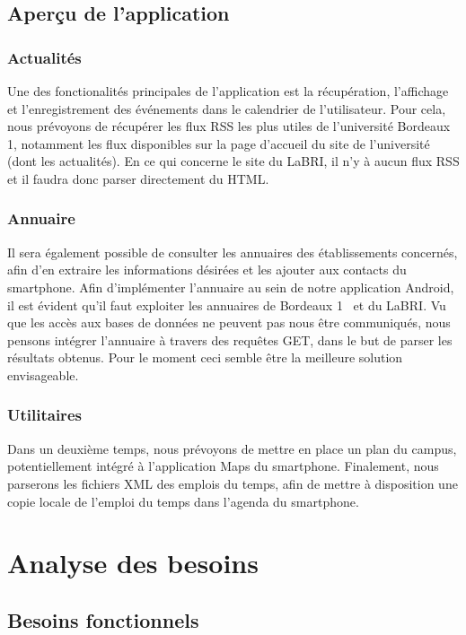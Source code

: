 \documentclass [pdftex,12pt] {report}
\begin{document}
\section{Aperçu de l'application}

\subsection{Actualités}
Une des fonctionalités principales de l'application est la récupération, l'affichage et l'enregistrement des événements dans le calendrier de l'utilisateur. 
Pour cela, nous prévoyons de récupérer les flux RSS les plus utiles de l'université Bordeaux 1\cite{fluxBDX1}, notamment les flux disponibles sur la page d'accueil du site de l'université (dont les actualités).
En ce qui concerne le site du LaBRI, il n'y à aucun flux RSS et il faudra donc parser directement du HTML.

\subsection{Annuaire}
Il sera également possible de consulter les annuaires des établissements concernés, afin d'en extraire les informations désirées et les ajouter aux contacts du smartphone.
Afin d'implémenter l'annuaire au sein de notre application Android, il est évident qu'il faut exploiter les annuaires de Bordeaux 1~\cite{AnnuaireBdx1} et du LaBRI. Vu que les accès aux bases de données ne peuvent pas nous être communiqués, nous pensons intégrer l'annuaire à travers des requêtes GET, dans le but de parser les résultats obtenus. Pour le moment ceci semble être la meilleure solution envisageable.

\subsection{Utilitaires}
Dans un deuxième temps, nous prévoyons de mettre en place un plan du campus, potentiellement intégré à l'application Maps du smartphone.
Finalement, nous parserons les fichiers XML des emplois du temps\cite{EdTxml}, afin de mettre à disposition une copie locale de l'emploi du temps dans l'agenda du smartphone.


\chapter{Analyse des besoins}

\section{Besoins fonctionnels}
\end{document}
